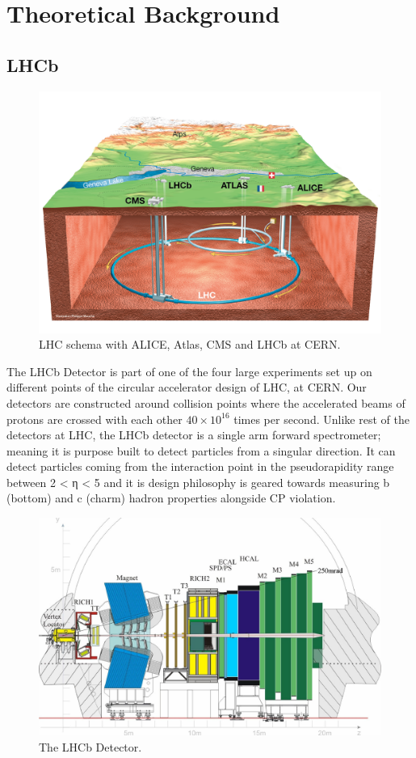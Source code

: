 \chapter{Theoretical Background}\label{chap:01}

\section{LHCb}

\begin{figure}[H]
    \centering
    \includegraphics[width=0.7\linewidth]{images/LHC_scheme.png}
    \caption{LHC schema with ALICE, Atlas, CMS and LHCb at CERN.}
    \label{LHC}
\end{figure}

The LHCb Detector is part of one of the four large experiments set up on different points of the circular accelerator design of LHC, at CERN. Our detectors are constructed around collision points where the accelerated beams of protons are crossed with each other \( 40 \times 10^{16} \) times per second. Unlike rest of the detectors at LHC, the LHCb detector is a single arm forward spectrometer; meaning it is purpose built to detect particles from a singular direction. It can detect particles coming from the interaction point in the pseudorapidity range between 2 < η < 5 and it is design philosophy is geared towards measuring b (bottom) and c (charm) hadron properties alongside CP violation. \cite{LHCb_detector}


\begin{figure}[H]
    \centering
    \includegraphics[width=0.7\linewidth]{images/LHCb_diagram.png}
    \caption{The LHCb Detector.}
    \label{LHCb}
\end{figure}

